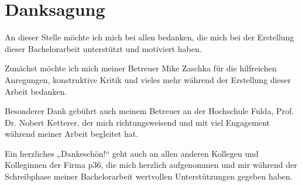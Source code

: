 
\chapter*{Danksagung}

An dieser Stelle möchte ich mich bei allen bedanken, die mich bei der Erstellung dieser Bachelorarbeit unterstützt und motiviert haben.

Zunächst möchte ich mich meiner Betreuer Mike Zaschka für die hilfreichen Anregungen, konstruktive Kritik und vieles mehr während der Erstellung dieser Arbeit bedanken. 

Besonderer Dank gebührt auch meinem Betreuer an der Hochschule Fulda, Prof. Dr. Nobert Ketterer, der mich richtungsweisend und mit viel Engagement während meiner Arbeit begleitet hat.

Ein herzliches „Dankeschön!“ geht auch an allen anderen Kollegen und Kolleginnen der Firma p36, die mich herzlich aufgenommen und mir während der Schreibphase meiner Bachelorarbeit wertvollen Unterstützungen gegeben haben.



